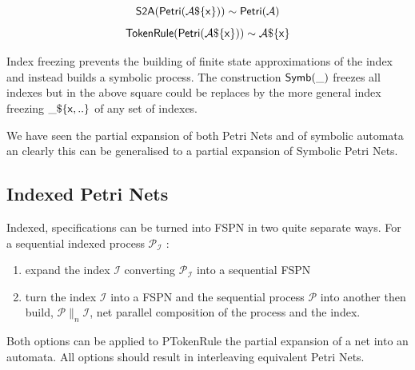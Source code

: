 \documentclass[]{article}
\begin{document}
\begin{center}
\begin{minipage}{0.4\textwidth}\end{minipage}
\begin{minipage}{0.4\textwidth}
\[{\sf S2A(Petri(\mathcal{A}\$\{x\}))\sim  Petri(\mathcal{A}) }\]
\[{\sf TokenRule(Petri(\mathcal{A}\$\{x\}))\sim  \mathcal{A}\$\{x\}}\]
\end{minipage}
\end{center}

Index freezing prevents the building of  finite state approximations of the index and instead builds a symbolic process. The construction ${\sf Symb(\_)}$ freezes all indexes but in the above square could be replaces by the more general index freezing ${\sf  \_\$\{x,..\}}$ of any set of indexes.

We have seen the partial expansion of both Petri Nets and of symbolic automata an clearly this can be generalised to a partial expansion of Symbolic Petri Nets.

\subsection{Indexed Petri Nets}

Indexed, specifications can be turned into FSPN in two quite separate ways. For a sequential indexed process $\mathcal{P_I}$ :
\begin{enumerate}
\item expand the  index $\mathcal{I}$ converting $\mathcal{P_I}$ into  a sequential FSPN
\item turn the index $\mathcal{I}$ into a FSPN and the sequential process $\mathcal{P}$  into another  then build, $\mathcal{P}\parallel_n \mathcal{I}$,  net parallel composition of  the process and the index.
\end{enumerate}
Both options can be applied to  {\sf PTokenRule} the partial expansion of a net into an automata.
All options  should result in interleaving equivalent Petri Nets.

 
\end{document}
